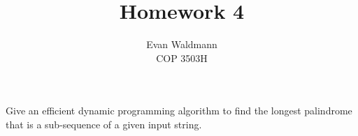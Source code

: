 \documentclass[10pt]{article}
\newenvironment{problem}[2][Problem]{\begin{trivlist}
		\item[\hskip \labelsep {\bfseries #1}\hskip \labelsep {\bfseries #2.}]}{\end{trivlist}}
\begin{document}
	
	
	
	
	\setlength{\topmargin}{0in}
	
	\setlength{\droptitle}{-13em} 
	\title{Homework 4} %
	\author{Evan Waldmann\\COP 3503H} %
	
	\maketitle
	
	
	\begin{problem}{1}
		 Give an efficient dynamic programming algorithm to find the longest palindrome that is a sub-sequence of a given input string. 
	\end{problem}
	
\end{document}
